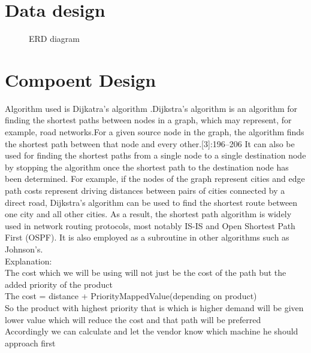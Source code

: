 \documentclass[oneside,a4paper,12pt]{report}
\begin{document}
\section{Data design }   
\begin{center}
	\begin{figure}[!htbp]
		\centering
	  \caption{ERD diagram}
	  \label{fig:state-dig}
	\end{figure}
\end{center} 
\newpage

\section{Compoent Design} 
Algorithm used is Dijkatra's algorithm .Dijkstra's algorithm is an algorithm for finding the shortest paths between nodes in a graph, which may represent, for example, road networks.For a given source node in the graph, the algorithm finds the shortest path between that node and every other.[3]:196–206 It can also be used for finding the shortest paths from a single node to a single destination node by stopping the algorithm once the shortest path to the destination node has been determined. For example, if the nodes of the graph represent cities and edge path costs represent driving distances between pairs of cities connected by a direct road, Dijkstra's algorithm can be used to find the shortest route between one city and all other cities. As a result, the shortest path algorithm is widely used in network routing protocols, most notably IS-IS and Open Shortest Path First (OSPF). It is also employed as a subroutine in other algorithms such as Johnson's.\\
Explanation: \\
The cost which we will be using will not just be the cost of the path but the added priority of the product\\
The cost = distance + PriorityMappedValue(depending on product) \\
So the product with highest priority that is which is higher demand  will be given lower value which will reduce the cost and that path will be preferred\\
Accordingly we can calculate and let the vendor know which machine he should approach first\\ 
\end{document}
